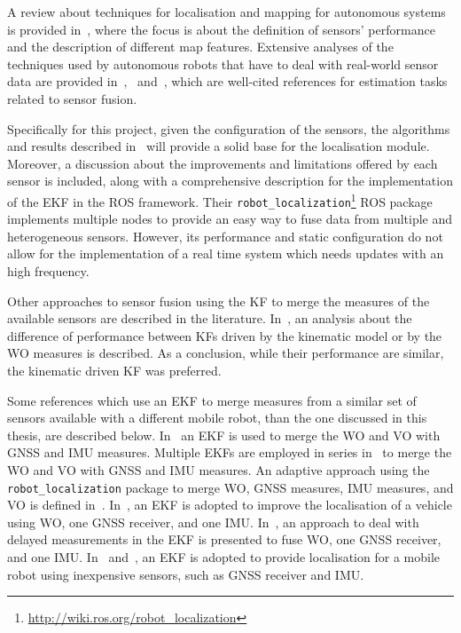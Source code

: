 \noindent 
A review about techniques for localisation and mapping for autonomous systems is provided in~\cite{9065135}, where the focus is about the definition of sensors' performance and the description of different map features.
Extensive analyses of the techniques used by autonomous robots that have to deal with real-world sensor data are provided in~\cite{thrun_probabilistic_2005},~\cite{gustafsson_statistical_2010} and~\cite{mitchell2007multi}, which are well-cited references for estimation tasks related to sensor fusion.

Specifically for this project, given the configuration of the sensors, the algorithms and results described in~\cite{moore_generalized_2016} will provide a solid base for the localisation module.
Moreover, a discussion about the improvements and limitations offered by each sensor is included, along with a comprehensive description for the implementation of the \gls{EKF} in the \gls{ROS} framework.
Their \texttt{robot\_localization}\footnote{\url{http://wiki.ros.org/robot_localization}} ROS package implements multiple nodes to provide an easy way to fuse data from multiple and heterogeneous sensors. 
However, its performance and static configuration do not allow for the implementation of a real time system which needs updates with an high frequency.

Other approaches to sensor fusion using the \gls{KF} to merge the measures of the available sensors are described in the literature.
In~\cite{801027}, an analysis about the difference of performance between \glspl{KF} driven by the  kinematic model or by the \gls{WO} measures is described. As a conclusion, while their performance are similar, the kinematic driven \gls{KF} was preferred.


Some references which use an \gls{EKF} to merge measures from a similar set of sensors available with a different mobile robot, than the one discussed in this thesis, are described below.
In~\cite{9024731} an \gls{EKF} is used to merge the \gls{WO} and \gls{VO} with \gls{GNSS} and \gls{IMU} measures.
Multiple \glspl{EKF} are employed in series in~\cite{9075286} to merge the \gls{WO} and \gls{VO} with \gls{GNSS} and \gls{IMU} measures.
An adaptive approach using the \texttt{robot\_localization} package to merge \gls{WO}, \gls{GNSS} measures, \gls{IMU} measures, and \gls{VO} is defined in~\cite{CHEN1298238}.
In~\cite{magnusson_improving_2012}, an \gls{EKF} is adopted to improve the localisation of a vehicle using \gls{WO}, one \gls{GNSS} receiver, and one \gls{IMU}.
In~\cite{8c506f630d4e478dace903637fa0a75b}, an approach to deal with delayed measurements in the \gls{EKF} is presented to fuse \gls{WO}, one \gls{GNSS} receiver, and one \gls{IMU}.
In~\cite{king_low_2008} and~\cite{skog2005low}, an \gls{EKF} is adopted to provide localisation for a mobile robot using inexpensive sensors, such as \gls{GNSS} receiver and \gls{IMU}.


